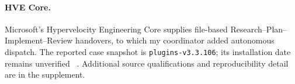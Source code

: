 \paragraph{HVE Core.}\label{sec:hve}
Microsoft's Hypervelocity Engineering Core supplies file-based
Research--Plan--Implement--Review handovers, to which my coordinator added autonomous
dispatch. The reported case snapshot is
\texttt{plugins-v3.3.106}; its installation date remains unverified
~\cite{hvecore}. Additional source qualifications and reproducibility detail
are in the supplement.
